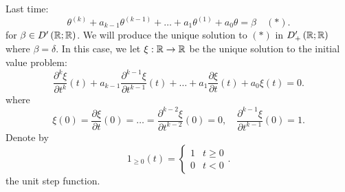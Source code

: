 
Last time: 
\[
	\theta ^{\left( k \right)  } + a _{k - 1} \theta^{\left( k - 1 \right) } + \ldots + a_1 \theta^{\left( 1 \right) } + a_0 \theta = \beta \quad \left( * \right) 
.\] 
for $\beta \in D'\left( \mathbb{R}; \mathbb{R} \right) $. We will produce the unique solution to $\left( * \right) $ in $D_{+}'\left( \mathbb{R}; \mathbb{R} \right) $ where $\beta = \delta$. In this case, we let $\xi : \mathbb{R} \to \mathbb{R}$ be the unique solution to the initial value problem:
\[
	\frac{\partial ^{k}\xi}{\partial t ^{k}} \left( t \right)  + a _{k - 1 }\frac{\partial ^{k - 1 }\xi}{\partial t ^{k - 1}} \left( t \right) + \ldots + a_1 \frac{\partial \xi}{\partial t} \left( t \right)  + a_0 \xi \left( t \right)  = 0
.\] where 
\[
	\xi\left( 0 \right) = \frac{\partial \xi}{\partial t} \left( 0 \right)  = \ldots = \frac{\partial ^{k - 2}\xi}{\partial t ^{k - 2}} \left( 0 \right)  = 0 , \quad \frac{\partial ^{k - 1} \xi}{\partial t ^{k - 1 }} \left( 0 \right) = 1
.\]
Denote by 
 \[
	 1_{\ge 0}\left( t \right)  = \begin{cases}
		 1 & t \ge  0 \\
		 0 & t < 0
	 \end{cases}
.\] 
the unit step function. 

